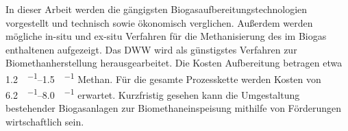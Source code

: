 
In dieser Arbeit werden die gängigsten Biogasaufbereitungstechnologien vorgestellt und technisch sowie ökonomisch verglichen. Außerdem werden mögliche in-situ und ex-situ Verfahren für die Methanisierung des im Biogas enthaltenen  aufgezeigt. \newline
Das \gls{DWW} wird als günstigstes Verfahren zur Biomethanherstellung herausgearbeitet. Die Kosten Aufbereitung betragen etwa \SIrange{1,2}{1,5}{\ct\per\kwh} Methan. Für die gesamte Prozesskette werden Kosten von \SIrange{6,2}{8,0}{\ct\per\kwh} erwartet. \newline
Kurzfristig gesehen kann die Umgestaltung bestehender Biogasanlagen zur Biomethaneinspeisung mithilfe von Förderungen wirtschaftlich sein.

